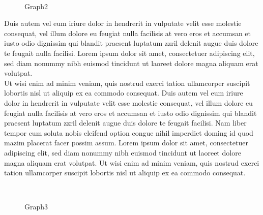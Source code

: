 \documentclass{scrartcl}
\begin{document}
\noindent \begin{wrapfigure}{r!}{0.37\textwidth}
     \vspace{-12pt}
     { \centering %
     \\ }
     \vspace{-5pt}
     \caption{Graph2}
     \vspace{-20pt}
\end{wrapfigure}
Duis autem vel eum iriure dolor in hendrerit in vulputate velit esse molestie consequat, vel illum dolore eu feugiat nulla facilisis at vero eros et accumsan et iusto odio dignissim qui blandit praesent luptatum zzril delenit augue duis dolore te feugait nulla facilisi. Lorem ipsum dolor sit amet, consectetuer adipiscing elit, sed diam nonummy nibh euismod tincidunt ut laoreet dolore magna aliquam erat volutpat.\\[8pt]
Ut wisi enim ad minim veniam, quis nostrud exerci tation ullamcorper suscipit lobortis nisl ut aliquip ex ea commodo consequat. Duis autem vel eum iriure dolor in hendrerit in vulputate velit esse molestie consequat, vel illum dolore eu feugiat nulla facilisis at vero eros et accumsan et iusto odio dignissim qui blandit praesent luptatum zzril delenit augue duis dolore te feugait facilisi.   \newpage
\noindent %
Nam liber tempor cum soluta nobis eleifend option congue nihil imperdiet doming id quod mazim placerat facer possim assum. Lorem ipsum dolor sit amet, consectetuer adipiscing elit, sed diam nonummy nibh euismod tincidunt ut laoreet dolore magna aliquam erat volutpat. Ut wisi enim ad minim veniam, quis nostrud exerci tation ullamcorper suscipit lobortis nisl ut aliquip ex ea commodo consequat.  \\[8pt]
\begin{figure}[h]
    \centering
     \\
    \caption{Graph3}
\end{figure}
\end{document}
